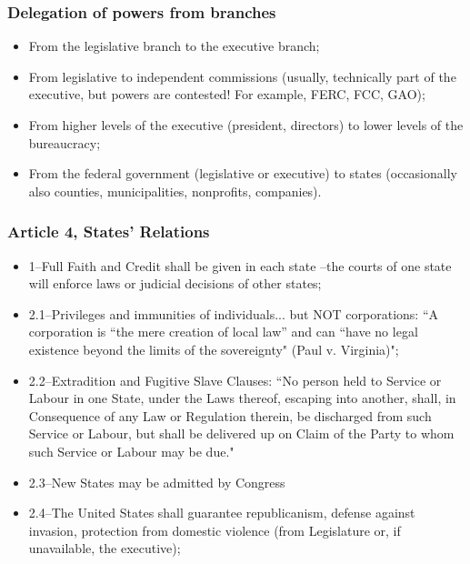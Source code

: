 \documentclass[aspectratio=169]{beamer}
\theoremstyle{principle}
\begin{document}
\begin{frame}
\frametitle{Delegation of powers from branches}


\begin{itemize} 
\item From the legislative branch to the executive branch;
\bigskip
\bigskip
\item From legislative to independent commissions (usually, technically part of the executive, but powers are contested! For example, FERC, FCC, GAO);
\bigskip
\bigskip
\item From higher levels of the executive (president, directors) to lower levels of the bureaucracy;
\bigskip
\bigskip
\item From the federal government (legislative or executive) to states (occasionally also counties, municipalities, nonprofits, companies).
\end{itemize}

\end{frame}

\begin{frame}
\frametitle{Article 4, States' Relations}

\begin{itemize} 
\item 1--Full Faith and Credit shall be given in each state --the courts of one state will enforce laws or judicial decisions of other states;
\bigskip
\item 2.1--Privileges and immunities of individuals... but NOT corporations: ``A corporation is “the mere creation of local law” and can “have no legal existence beyond the limits of the sovereignty" (Paul v. Virginia)";
\bigskip
\item 2.2--Extradition and Fugitive Slave Clauses: ``No person held to Service or Labour in one State, under the Laws thereof, escaping into another, shall, in Consequence of any Law or Regulation therein, be discharged from such Service or Labour, but shall be delivered up on Claim of the Party to whom such Service or Labour may be due."
\bigskip
\item 2.3--New States may be admitted by Congress
\bigskip

\item 2.4--The United States shall guarantee republicanism, defense against invasion, protection from domestic violence (from Legislature or, if unavailable, the executive); 
\end{itemize}

\end{frame}
\end{document}
